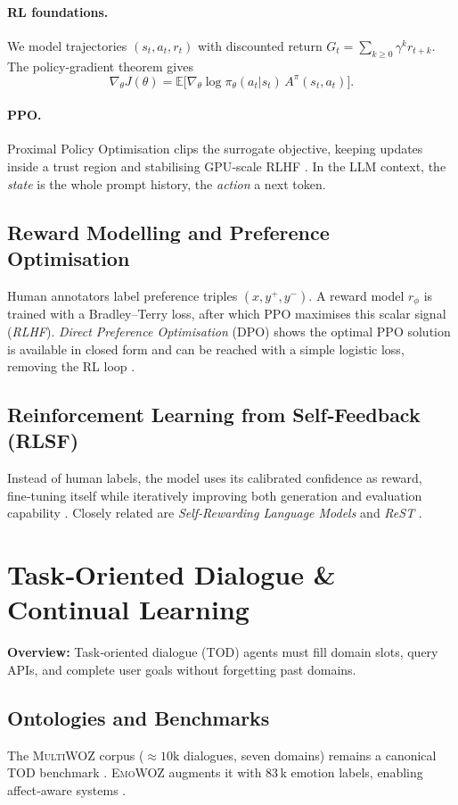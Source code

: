 \documentclass[11pt]{article}
\begin{document}
\paragraph{RL foundations.}  We model trajectories \((s_t,a_t,r_t)\) with discounted return \(G_t=\sum_{k\ge0}\gamma^k r_{t+k}\).  The policy‑gradient theorem gives
\[
  \nabla_\theta J(\theta)=\mathbb{E}\big[\nabla_\theta \log \pi_\theta(a_t|s_t)\,A^\pi(s_t,a_t)\big].
\]
\paragraph{PPO.}  Proximal Policy Optimisation clips the surrogate objective, keeping updates inside a trust region and stabilising GPU‑scale RLHF \citep{schulman2017ppo}.  In the LLM context, the \emph{state} is the whole prompt history, the \emph{action} a next token.

\subsection{Reward Modelling and Preference Optimisation}
Human annotators label preference triples \((x,y^+,y^-)\).  A reward model \(r_\phi\) is trained with a Bradley–Terry loss, after which PPO maximises this scalar signal (\emph{RLHF}).  \emph{Direct Preference Optimisation} (DPO) shows the optimal PPO solution is available in closed form and can be reached with a simple logistic loss, removing the RL loop \citep{rafailov2023dpo}.

\subsection{Reinforcement Learning from Self‑Feedback (RLSF)}
Instead of human labels, the model uses its calibrated confidence as reward, fine‑tuning itself while iteratively improving both generation and evaluation capability \citep{sutton2024rlsf}.  Closely related are \emph{Self‑Rewarding Language Models} \citep{yuan2024srlm} and \emph{ReST} \citep{gulcehre2023rest}.

\section{Task‑Oriented Dialogue \& Continual Learning}
\textbf{Overview:}  Task‑oriented dialogue (TOD) agents must fill domain slots, query APIs, and complete user goals without forgetting past domains.

\subsection{Ontologies and Benchmarks}
The \textsc{MultiWOZ} corpus (\(\approx10\text{k}\) dialogues, seven domains) remains a canonical TOD benchmark \citep{budzianowski2018multiwoz}.  \textsc{EmoWOZ} augments it with 83\,k emotion labels, enabling affect‑aware systems \citep{li2023emowoz}.
\end{document}
